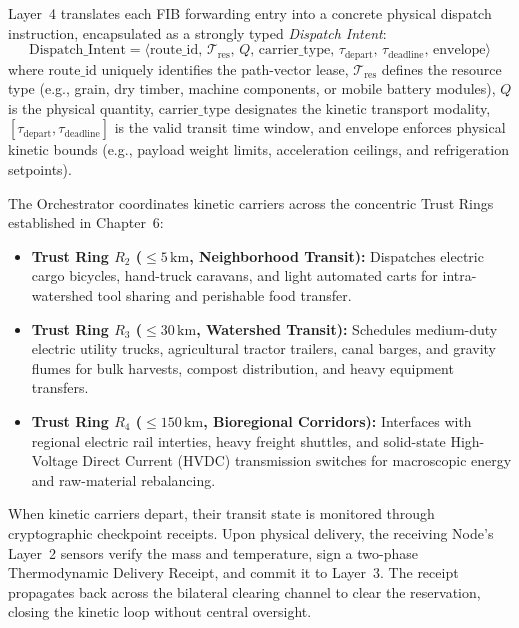 Layer~4 translates each FIB forwarding entry into a concrete physical dispatch instruction, encapsulated as a strongly typed \textit{Dispatch Intent}:
\begin{equation}
\mathrm{Dispatch\_Intent} = \langle \mathrm{route\_id}, \, \mathcal{T}_{\mathrm{res}}, \, Q, \, \mathrm{carrier\_type}, \, \tau_{\mathrm{depart}}, \, \tau_{\mathrm{deadline}}, \, \mathrm{envelope} \rangle
\label{eq:ch5_dispatch}
\end{equation}
where $\mathrm{route\_id}$ uniquely identifies the path-vector lease, $\mathcal{T}_{\mathrm{res}}$ defines the resource type (e.g., grain, dry timber, machine components, or mobile battery modules), $Q$ is the physical quantity, $\mathrm{carrier\_type}$ designates the kinetic transport modality, $[\tau_{\mathrm{depart}}, \tau_{\mathrm{deadline}}]$ is the valid transit time window, and $\mathrm{envelope}$ enforces physical kinetic bounds (e.g., payload weight limits, acceleration ceilings, and refrigeration setpoints).

The Orchestrator coordinates kinetic carriers across the concentric Trust Rings established in Chapter~6:
\begin{itemize}
  \item \textbf{Trust Ring $R_2$ ($\le 5\,\mathrm{km}$, Neighborhood Transit):} Dispatches electric cargo bicycles, hand-truck caravans, and light automated carts for intra-watershed tool sharing and perishable food transfer.
  \item \textbf{Trust Ring $R_3$ ($\le 30\,\mathrm{km}$, Watershed Transit):} Schedules medium-duty electric utility trucks, agricultural tractor trailers, canal barges, and gravity flumes for bulk harvests, compost distribution, and heavy equipment transfers.
  \item \textbf{Trust Ring $R_4$ ($\le 150\,\mathrm{km}$, Bioregional Corridors):} Interfaces with regional electric rail interties, heavy freight shuttles, and solid-state High-Voltage Direct Current (HVDC) transmission switches for macroscopic energy and raw-material rebalancing.
\end{itemize}

When kinetic carriers depart, their transit state is monitored through cryptographic checkpoint receipts. Upon physical delivery, the receiving Node's Layer~2 sensors verify the mass and temperature, sign a two-phase Thermodynamic Delivery Receipt, and commit it to Layer~3. The receipt propagates back across the bilateral clearing channel to clear the reservation, closing the kinetic loop without central oversight.

